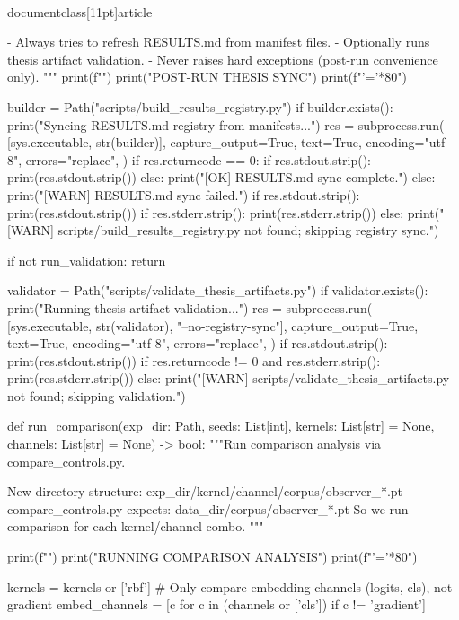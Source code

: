 \\documentclass[11pt]{article}
\begin{document}
\begin{CodeBlock}
    - Always tries to refresh RESULTS.md from manifest files.
    - Optionally runs thesis artifact validation.
    - Never raises hard exceptions (post-run convenience only).
    """
    print(f"")
    print("POST-RUN THESIS SYNC")
    print(f"{'='*80}")

    builder = Path("scripts/build_results_registry.py")
    if builder.exists():
        print("Syncing RESULTS.md registry from manifests...")
        res = subprocess.run(
            [sys.executable, str(builder)],
            capture_output=True,
            text=True,
            encoding="utf-8",
            errors="replace",
        )
        if res.returncode == 0:
            if res.stdout.strip():
                print(res.stdout.strip())
            else:
                print("[OK] RESULTS.md sync complete.")
        else:
            print("[WARN] RESULTS.md sync failed.")
            if res.stdout.strip():
                print(res.stdout.strip())
            if res.stderr.strip():
                print(res.stderr.strip())
    else:
        print("[WARN] scripts/build_results_registry.py not found; skipping registry sync.")

    if not run_validation:
        return

    validator = Path("scripts/validate_thesis_artifacts.py")
    if validator.exists():
        print("Running thesis artifact validation...")
        res = subprocess.run(
            [sys.executable, str(validator), "--no-registry-sync"],
            capture_output=True,
            text=True,
            encoding="utf-8",
            errors="replace",
        )
        if res.stdout.strip():
            print(res.stdout.strip())
        if res.returncode != 0 and res.stderr.strip():
            print(res.stderr.strip())
    else:
        print("[WARN] scripts/validate_thesis_artifacts.py not found; skipping validation.")


def run_comparison(exp_dir: Path, seeds: List[int], kernels: List[str] = None, channels: List[str] = None) -> bool:
    """Run comparison analysis via compare_controls.py.

    New directory structure: exp_dir/kernel/channel/corpus/observer_*.pt
    compare_controls.py expects: data_dir/corpus/observer_*.pt
    So we run comparison for each kernel/channel combo.
    """

    print(f"")
    print("RUNNING COMPARISON ANALYSIS")
    print(f"{'='*80}")

    kernels = kernels or ['rbf']
    # Only compare embedding channels (logits, cls), not gradient
    embed_channels = [c for c in (channels or ['cls']) if c != 'gradient']


\end{CodeBlock}
\end{document}
